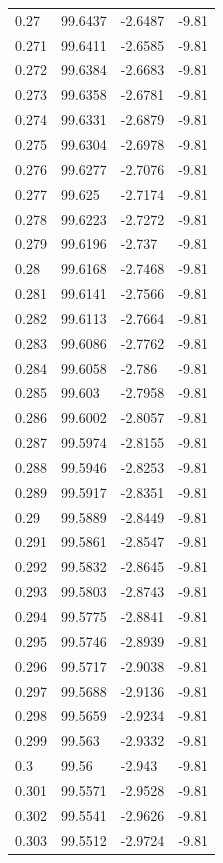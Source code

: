 \begin{tabular}{llll}
0.27 & 99.6437 & -2.6487 & -9.81 \\
0.271 & 99.6411 & -2.6585 & -9.81 \\
0.272 & 99.6384 & -2.6683 & -9.81 \\
0.273 & 99.6358 & -2.6781 & -9.81 \\
0.274 & 99.6331 & -2.6879 & -9.81 \\
0.275 & 99.6304 & -2.6978 & -9.81 \\
0.276 & 99.6277 & -2.7076 & -9.81 \\
0.277 & 99.625 & -2.7174 & -9.81 \\
0.278 & 99.6223 & -2.7272 & -9.81 \\
0.279 & 99.6196 & -2.737 & -9.81 \\
0.28 & 99.6168 & -2.7468 & -9.81 \\
0.281 & 99.6141 & -2.7566 & -9.81 \\
0.282 & 99.6113 & -2.7664 & -9.81 \\
0.283 & 99.6086 & -2.7762 & -9.81 \\
0.284 & 99.6058 & -2.786 & -9.81 \\
0.285 & 99.603 & -2.7958 & -9.81 \\
0.286 & 99.6002 & -2.8057 & -9.81 \\
0.287 & 99.5974 & -2.8155 & -9.81 \\
0.288 & 99.5946 & -2.8253 & -9.81 \\
0.289 & 99.5917 & -2.8351 & -9.81 \\
0.29 & 99.5889 & -2.8449 & -9.81 \\
0.291 & 99.5861 & -2.8547 & -9.81 \\
0.292 & 99.5832 & -2.8645 & -9.81 \\
0.293 & 99.5803 & -2.8743 & -9.81 \\
0.294 & 99.5775 & -2.8841 & -9.81 \\
0.295 & 99.5746 & -2.8939 & -9.81 \\
0.296 & 99.5717 & -2.9038 & -9.81 \\
0.297 & 99.5688 & -2.9136 & -9.81 \\
0.298 & 99.5659 & -2.9234 & -9.81 \\
0.299 & 99.563 & -2.9332 & -9.81 \\
0.3 & 99.56 & -2.943 & -9.81 \\
0.301 & 99.5571 & -2.9528 & -9.81 \\
0.302 & 99.5541 & -2.9626 & -9.81 \\
0.303 & 99.5512 & -2.9724 & -9.81 \\

\end{tabular}
